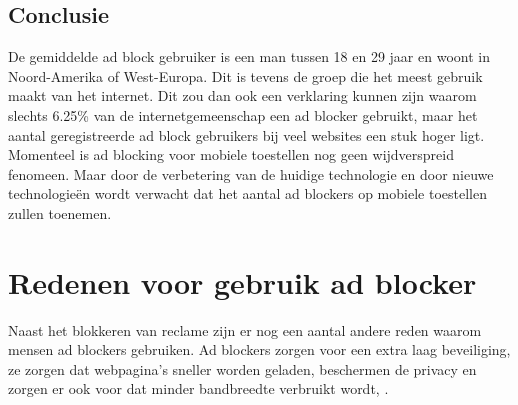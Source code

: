 \documentclass[pdftex,a4paper,12pt,twoside]{report}
\begin{document}
\subsection{Conclusie}
\label{sec Conclusie}
De gemiddelde ad block gebruiker is een man tussen 18 en 29 jaar en woont in Noord-Amerika of West-Europa. Dit is tevens de groep die het meest gebruik maakt van het internet. Dit zou dan ook een verklaring kunnen zijn waarom slechts 6.25\% van de internetgemeenschap een ad blocker gebruikt, maar het aantal geregistreerde ad block gebruikers bij veel websites een stuk hoger ligt. Momenteel is ad blocking voor mobiele toestellen nog geen wijdverspreid fenomeen. Maar door de verbetering van de huidige technologie en door nieuwe technologieën wordt verwacht dat het aantal ad blockers op mobiele toestellen zullen toenemen.

\section{Redenen voor gebruik ad blocker}
\label{sec:Redenen voor gebruik ad blocker}
Naast het blokkeren van reclame zijn er nog een aantal andere reden waarom mensen ad blockers gebruiken. Ad blockers zorgen voor een extra laag beveiliging, ze zorgen dat webpagina's sneller worden geladen, beschermen de privacy en zorgen er ook voor dat minder bandbreedte verbruikt wordt, \cite{IAB2014}.

\end{document}
